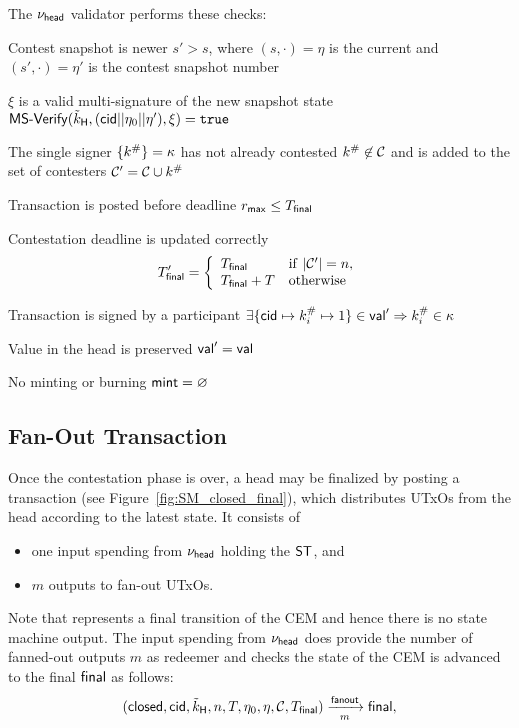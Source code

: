 \noindent The $\nu_\mathsf{head}$ validator performs these checks:
\begin{menumerate}
  \item Contest snapshot is newer $s' > s$, where $(s, \cdot) = \eta$ is the current and $(s', \cdot) = \eta'$ is the contest snapshot number
  \item $\xi$ is a valid multi-signature of the new snapshot state
  $\mathsf{MS\textsf{-}{}Verify}(\tilde{k}_{\mathsf{H}},(\mathsf{cid} || \eta_{0} || \eta'),\xi) = \mathtt{true}$
  \item The single signer $\{k^{\#}\} = \kappa$ has not already contested $k^{\#} \not\in \mathcal{C}$ and is added to the set of contesters $\mathcal{C}' = \mathcal{C} \cup k^{\#}$
  \item Transaction is posted before deadline $r_{\mathsf{max}} \leq T_{\mathsf{final}}$
  \item Contestation deadline is updated correctly
     \[
       T_{\mathsf{final}}' = \left\{\begin{array}{ll}
                           T_{\mathsf{final}}     & \mathrm{if} ~ |\mathcal{C}'| = n, \\
                           T_{\mathsf{final}} + T & \mathrm{otherwise}
                         \end{array}\right.
    \]
  \item Transaction is signed by a participant $\exists \{\mathsf{cid} \mapsto k^{\#}_{i} \mapsto 1\} \in \mathsf{val}' \Rightarrow k^{\#}_{i} \in \kappa$
  \item Value in the head is preserved $\mathsf{val}' = \mathsf{val}$
  \item No minting or burning $\mathsf{mint} = \varnothing$
\end{menumerate}

\subsection{Fan-Out Transaction}



\noindent Once the contestation phase is over, a head may be finalized by posting a
\mtxFanout{} transaction (see Figure~\ref{fig:SM_closed_final}), which
distributes UTxOs from the head according to the latest state. It consists of
\begin{itemize}
  \item one input spending from $\nu_\mathsf{head}$ holding the $\mathsf{ST}$, and
  \item $m$ outputs to fan-out UTxOs.
\end{itemize}
Note that \mtxFanout{} represents a final transition of the CEM and hence there
is no state machine output. The input spending from $\nu_\mathsf{head}$ does provide the
number of fanned-out outputs $m$ as redeemer and checks the state of the CEM is
advanced to the final $\mathsf{final}$ as follows:
\[
  (\mathsf{closed},\mathsf{cid},\tilde{k}_{\mathsf{H}},n,T,\eta_0,\eta,\mathcal{C},T_{\mathsf{final}}) \xrightarrow[m]{\mathsf{fanout}} \mathsf{final},
\]

